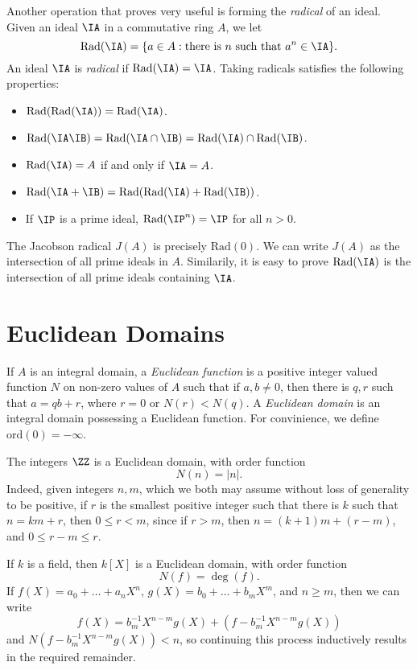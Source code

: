 Another operation that proves very useful is forming the \emph{radical} of an ideal. Given an ideal $\IA$ in a commutative ring $A$, we let
%
\[ \text{Rad}(\IA) = \{ a \in A: \text{there is $n$ such that $a^n \in \IA$} \}. \]
%
An ideal $\IA$ is \emph{radical} if $\text{Rad}(\IA) = \IA$. Taking radicals satisfies the following properties:
%
\begin{itemize}
    \item $\text{Rad}(\text{Rad}(\IA)) = \text{Rad}(\IA)$.
    \item $\text{Rad}(\IA \IB) = \text{Rad}(\IA \cap \IB) = \text{Rad}(\IA) \cap \text{Rad}(\IB)$.
    \item $\text{Rad}(\IA) = A$ if and only if $\IA = A$.
    \item $\text{Rad}(\IA + \IB) = \text{Rad}(\text{Rad}(\IA) + \text{Rad}(\IB))$.
    \item If $\IP$ is a prime ideal, $\text{Rad}(\IP^n) = \IP$ for all $n > 0$.
\end{itemize}
%
The Jacobson radical $J(A)$ is precisely $\text{Rad}(0)$. We can write $J(A)$ as the intersection of all prime ideals in $A$. Similarily, it is easy to prove $\text{Rad}(\IA)$ is the intersection of all prime ideals containing $\IA$.

\section{Euclidean Domains}

If $A$ is an integral domain, a \emph{Euclidean function} is a positive integer valued function $N$ on non-zero values of $A$ such that if $a,b \neq 0$, then there is $q,r$ such that $a = qb + r$, where $r = 0$ or $N(r) < N(q)$. A \emph{Euclidean domain} is an integral domain possessing a Euclidean function. For convinience, we define $\text{ord}(0) = -\infty$.

\begin{example}
    The integers $\ZZ$ is a Euclidean domain, with order function
    \[ N(n) = |n|. \]
    Indeed, given integers $n,m$, which we both may assume without loss of generality to be positive, if $r$ is the smallest positive integer such that there is $k$ such that $n = km + r$, then $0 \leq r < m$, since if $r > m$, then $n = (k+1)m + (r - m)$, and $0 \leq r-m \leq r$.
\end{example}

\begin{example}
    If $k$ is a field, then $k[X]$ is a Euclidean domain, with order function
    \[ N(f) = \deg(f). \]
    If $f(X) = a_0 + \dots + a_nX^n$, $g(X) = b_0 + \dots + b_mX^m$, and $n \geq m$, then we can write
    \[ f(X) = b_m^{-1} X^{n-m} g(X) + (f - b_m^{-1} X^{n-m}g(X)) \]
    and $N(f - b_m^{-1} X^{n-m}g(X)) < n$, so continuing this process inductively results in the required remainder.
\end{example}

